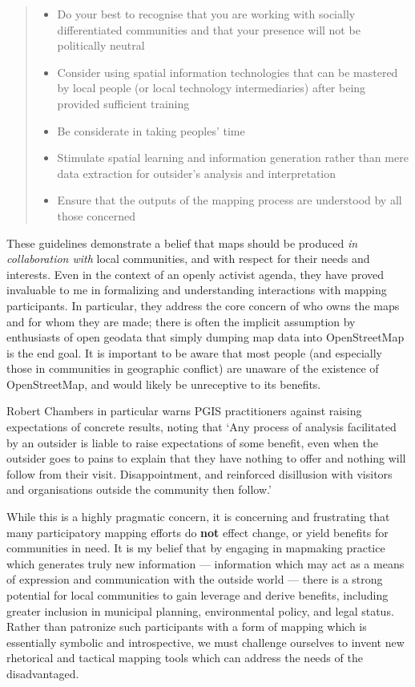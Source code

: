 \documentclass[11pt,oneside,notitlepage]{report}
\begin{document}
{{\begin{quote}\begin{itemize}
\item Do your best to recognise that you are working with socially differentiated communities and that your presence will not be politically neutral
\item Consider using spatial information technologies that can be mastered by local people (or local technology intermediaries) after being provided sufficient training
\item Be considerate in taking peoples' time
\item Stimulate spatial learning and information generation rather than mere data extraction for outsider’s analysis and interpretation
\item Ensure that the outputs of the mapping process are understood by all those concerned
\end{itemize}
\cite{rambaldi2006practical}
\end{quote}

These guidelines demonstrate a belief that maps should be produced \emph{in collaboration with} local communities, and with respect for their needs and interests. Even in the context of an openly activist agenda, they have proved invaluable to me in formalizing and understanding interactions with mapping participants. In particular, they address the core concern of who owns the maps and for whom they are made; there is often the implicit assumption by enthusiasts of open geodata that simply dumping map data into OpenStreetMap is the end goal. It is important to be aware that most people (and especially those in communities in geographic conflict) are unaware of the existence of OpenStreetMap, and would likely be unreceptive to its benefits. 

Robert Chambers in particular warns \ac{PGIS} practitioners against raising expectations of concrete results, noting that `Any process of analysis facilitated by an outsider is liable to raise expectations of some benefit, even when the outsider goes to pains to explain that they have nothing to offer and nothing will follow from their visit. Disappointment, and reinforced disillusion with visitors and organisations outside the community then follow.' \cite{chambers2006whose}

While this is a highly pragmatic concern, it is concerning and frustrating that many participatory mapping efforts do \textbf{not} effect change, or yield benefits for communities in need. It is my belief that by engaging in mapmaking practice which generates truly new information --- information which may act as a means of expression and communication with the outside world --- there is a strong potential for local communities to gain leverage and derive benefits, including greater inclusion in municipal planning, environmental policy, and legal status. Rather than patronize such participants with a form of mapping which is essentially symbolic and introspective, we must challenge ourselves to invent new rhetorical and tactical mapping tools which can address the needs of the disadvantaged.  

}}
\end{document}
